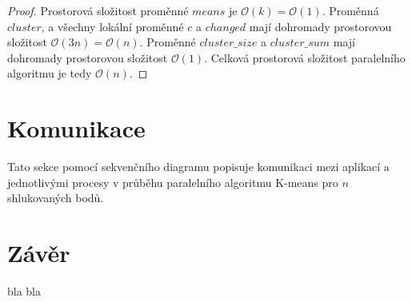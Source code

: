 \documentclass[a4paper, 11pt, fleqn]{scrartcl}
\begin{document}
        \begin{proof}
          Prostorová složitost proměnné $means$ je $\mathcal{O}(k) = \mathcal{O}(1)$. Proměnná $cluster$, a všechny lokální proměnné $c$ a $changed$ mají dohromady prostorovou složitost $\mathcal{O}(3n) = \mathcal{O}(n)$. Proměnné $cluster\_size$ a $cluster\_sum$ mají dohromady prostorovou složitost $\mathcal{O}(1)$. Celková prostorová složitost paralelního algoritmu je tedy $\mathcal{O}(n)$.
        \end{proof}

  \section{Komunikace}
    Tato sekce pomocí sekvenčního diagramu popisuje komunikaci mezi aplikací a jednotlivými procesy v průběhu paralelního algoritmu K-means pro $n$ shlukovaných bodů.

    \begin{figure}[!ht]
      \centering
    \end{figure}

  \section{Závěr}
    bla bla


\end{document}
